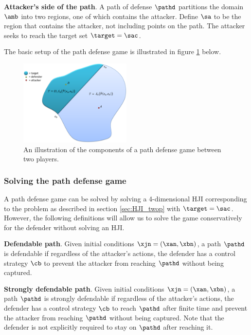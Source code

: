 \begin{defn} %
\textbf{Attacker's side of the path}. A path of defense $\pathd$ partitions the domain $\amb$ into two regions, one of which contains the attacker. Define $\sa$ to be the region that contains the attacker, not including points on the path. The attacker seeks to reach the target set $\target=\sac$.
\end{defn}

The basic setup of the path defense game is illustrated in figure \ref{fig:pd_form} below.
\begin{figure}[h]
\centering
\includegraphics[width=0.5\textwidth]{"fig/pd game formulation"}
\caption{An illustration of the components of a path defense game between two players.}
\label{fig:pd_form}
\end{figure}

\subsubsection{Solving the path defense game}
A path defense game can be solved by solving a 4-dimensional HJI corresponding to the problem as described in section \ref{sec:HJI_twop} with $\target=\sac$. However, the following definitions will allow us to solve the game conservatively for the defender without solving an HJI.

\begin{defn} %
\textbf{Defendable path}. Given initial conditions $\xjn=(\xan,\xbn)$, a path $\pathd$ is defendable if regardless of the attacker's actions, the defender has a control strategy $\cb$ to prevent the attacker from reaching $\pathd$ without being captured.
\end{defn}

\begin{defn} %
\textbf{Strongly defendable path}. Given initial conditions $\xjn=(\xan,\xbn)$, a path $\pathd$ is strongly defendable if regardless of the attacker's actions, the defender has a control strategy $\cb$ to reach $\pathd$ after finite time and prevent the attacker from reaching $\pathd$ without being captured. Note that the defender is not explicitly required to stay on $\pathd$ after reaching it.
\end{defn}


